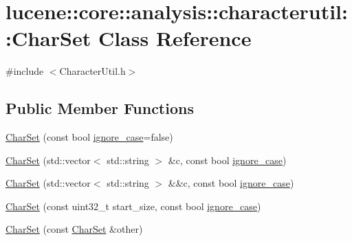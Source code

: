 \hypertarget{classlucene_1_1core_1_1analysis_1_1characterutil_1_1CharSet}{}\section{lucene\+:\+:core\+:\+:analysis\+:\+:characterutil\+:\+:Char\+Set Class Reference}
\label{classlucene_1_1core_1_1analysis_1_1characterutil_1_1CharSet}


{\ttfamily \#include $<$Character\+Util.\+h$>$}

\subsection*{Public Member Functions}
\begin{DoxyCompactItemize}
\item 
\mbox{\hyperlink{classlucene_1_1core_1_1analysis_1_1characterutil_1_1CharSet_a983251c2914f0fbbb46cb6e73864474f}{Char\+Set}} (const bool \mbox{\hyperlink{classlucene_1_1core_1_1analysis_1_1characterutil_1_1CharSet_a02b6c12938776a5c94003f6ebe784f17}{ignore\+\_\+case}}=false)
\item 
\mbox{\hyperlink{classlucene_1_1core_1_1analysis_1_1characterutil_1_1CharSet_a86ec41a435119d58269b961894bcb88c}{Char\+Set}} (std\+::vector$<$ std\+::string $>$ \&c, const bool \mbox{\hyperlink{classlucene_1_1core_1_1analysis_1_1characterutil_1_1CharSet_a02b6c12938776a5c94003f6ebe784f17}{ignore\+\_\+case}})
\item 
\mbox{\hyperlink{classlucene_1_1core_1_1analysis_1_1characterutil_1_1CharSet_a124a55e602398b3404c0eb99f9f7ed87}{Char\+Set}} (std\+::vector$<$ std\+::string $>$ \&\&c, const bool \mbox{\hyperlink{classlucene_1_1core_1_1analysis_1_1characterutil_1_1CharSet_a02b6c12938776a5c94003f6ebe784f17}{ignore\+\_\+case}})
\item 
\mbox{\hyperlink{classlucene_1_1core_1_1analysis_1_1characterutil_1_1CharSet_aa0426762b8a93f85d8b6e5486be0cb66}{Char\+Set}} (const uint32\+\_\+t start\+\_\+size, const bool \mbox{\hyperlink{classlucene_1_1core_1_1analysis_1_1characterutil_1_1CharSet_a02b6c12938776a5c94003f6ebe784f17}{ignore\+\_\+case}})
\item 
\mbox{\hyperlink{classlucene_1_1core_1_1analysis_1_1characterutil_1_1CharSet_ac2220cc2163fb0d99e8b208ef18d2347}{Char\+Set}} (const \mbox{\hyperlink{classlucene_1_1core_1_1analysis_1_1characterutil_1_1CharSet}{Char\+Set}} \&other)
\item 

\end{DoxyCompactItemize}
